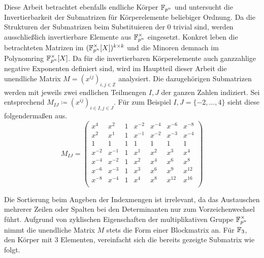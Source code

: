 Diese Arbeit betrachtet ebenfalls endliche Körper $\field{p}[n]$ und untersucht die Invertierbarkeit der Submatrizen für Körperelemente beliebiger Ordnung. Da die Strukturen der Submatrizen beim Substituieren der $0$ trivial sind, werden ausschließlich invertierbare Elemente aus $\field{p}[n]^\times$ eingesetzt. Konkret leben die betrachteten Matrizen im $(\field{p}[n]^\times [X])^{k \times k}$ und die Minoren demnach im Polynomring $\field{p}[n]^\times [X]$. Da für die invertierbaren Körperelemente auch ganzzahlige negative Exponenten definiert sind, wird im Hauptteil dieser Arbeit die unendliche Matrix $M = \left( x^{ij} \right)_{i,j \in \mathbb{Z}}$ analysiert. Die dazugehörigen Submatrizen werden mit jeweils zwei endlichen Teilmengen $I,J$ der ganzen Zahlen indiziert. Sei entsprechend $M_{IJ} \coloneqq \left( x^{ij} \right)_{i \in I,j \in J}$. Für zum Beispiel $I,J = \{-2, \dots, 4\}$ sieht diese folgendermaßen aus.
\begin{equation*}
    M_{IJ} = \begin{pmatrix}
        x^4     & x^{2} & 1    & x^{-2} & x^{-4}& x^{-6}& x^{-8}\\
        x^{2}   & x^{1} & 1    & x^{-1} & x^{-2}& x^{-3}& x^{-4}\\
        1       & 1     & 1    & 1      & 1     & 1     & 1     \\
        x^{-2}  & x^{-1}& 1    & x^{1}  & x^{2} & x^{3} & x^{4} \\
        x^{-4}  & x^{-2}& 1    & x^{2}  & x^{4} & x^{6} & x^{8} \\
        x^{-6}  & x^{-3}& 1    & x^{3}  & x^{6} & x^{9} & x^{12} \\
        x^{-8}  & x^{-4}& 1    & x^{4}  & x^{8} & x^{12} & x^{16} \\
    \end{pmatrix}
\end{equation*}

Die Sortierung beim Angeben der Indexmengen ist irrelevant, da das Austauschen mehrerer Zeilen oder Spalten bei den Determinanten nur zum Vorzeichenwechsel führt. Aufgrund von zyklischen Eigenschaften der multiplikativen Gruppe $\field{p}[n]^\times$ nimmt die unendliche Matrix $M$ stets die Form einer Blockmatrix an. Für $\field{3}$, den Körper mit 3 Elementen, vereinfacht sich die bereits gezeigte Submatrix wie folgt.

